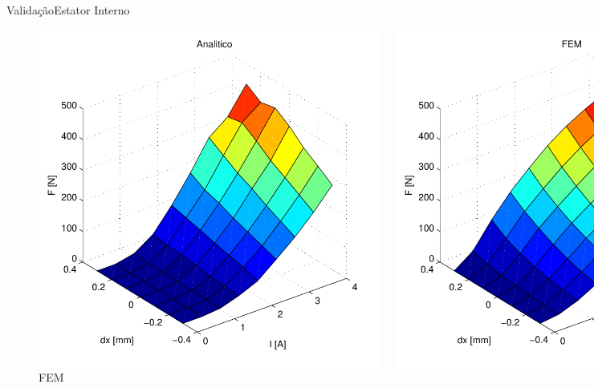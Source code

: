 \documentclass{beamer}
\begin{document}
\begin{frame}{Validação}{Estator Interno}
	\begin{figure}
	    \begin{columns}
			\includegraphics[width=0.7\textheight]{Simulacoes/Ativo/validacao_ativo_map_analitico}
			\caption*{Analítico}
	        \includegraphics[width=0.7\textheight]{Simulacoes/Ativo/validacao_ativo_map_fem}
			\caption*{FEM}
	      \end{columns}
	    
	\end{figure}
\end{frame}
\end{document}
